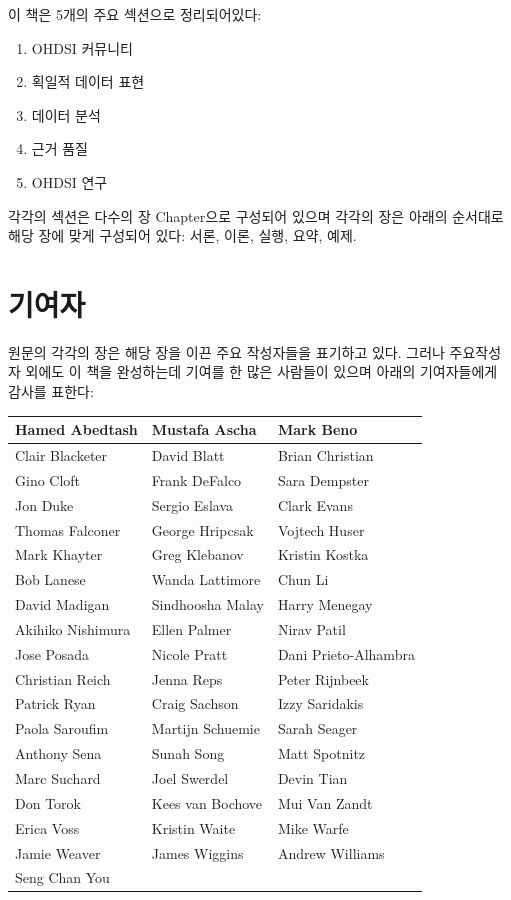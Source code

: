\documentclass[11pt]{book}
\providecommand{\tightlist}{%
  \setlength{\itemsep}{0pt}\setlength{\parskip}{0pt}}
\theoremstyle{definition}
\theoremstyle{definition}
\theoremstyle{definition}
\theoremstyle{remark}
\begin{document}
이 책은 5개의 주요 섹션으로 정리되어있다:

\begin{enumerate}
\def\labelenumi{\Roman{enumi})}
\tightlist
\item
  OHDSI 커뮤니티
\item
  획일적 데이터 표현
\item
  데이터 분석
\item
  근거 품질
\item
  OHDSI 연구
\end{enumerate}

각각의 섹션은 다수의 장 Chapter으로 구성되어 있으며 각각의 장은 아래의
순서대로 해당 장에 맞게 구성되어 있다: 서론, 이론, 실행, 요약, 예제.

\section*{기여자}

원문의 각각의 장은 해당 장을 이끈 주요 작성자들을 표기하고 있다. 그러나
주요작성자 외에도 이 책을 완성하는데 기여를 한 많은 사람들이 있으며
아래의 기여자들에게 감사를 표한다:

\begin{tabular}{l|l|l}
\hline
Hamed Abedtash & Mustafa Ascha & Mark Beno\\
\hline
Clair Blacketer & David Blatt & Brian Christian\\
\hline
Gino Cloft & Frank DeFalco & Sara Dempster\\
\hline
Jon Duke & Sergio Eslava & Clark Evans\\
\hline
Thomas Falconer & George Hripcsak & Vojtech Huser\\
\hline
Mark Khayter & Greg Klebanov & Kristin Kostka\\
\hline
Bob Lanese & Wanda Lattimore & Chun Li\\
\hline
David Madigan & Sindhoosha Malay & Harry Menegay\\
\hline
Akihiko Nishimura & Ellen Palmer & Nirav Patil\\
\hline
Jose Posada & Nicole Pratt & Dani Prieto-Alhambra\\
\hline
Christian Reich & Jenna Reps & Peter Rijnbeek\\
\hline
Patrick Ryan & Craig Sachson & Izzy Saridakis\\
\hline
Paola Saroufim & Martijn Schuemie & Sarah Seager\\
\hline
Anthony Sena & Sunah Song & Matt Spotnitz\\
\hline
Marc Suchard & Joel Swerdel & Devin Tian\\
\hline
Don Torok & Kees van Bochove & Mui Van Zandt\\
\hline
Erica Voss & Kristin Waite & Mike Warfe\\
\hline
Jamie Weaver & James Wiggins & Andrew Williams\\
\hline
Seng Chan You &  & \\
\hline
\end{tabular}
\end{document}
